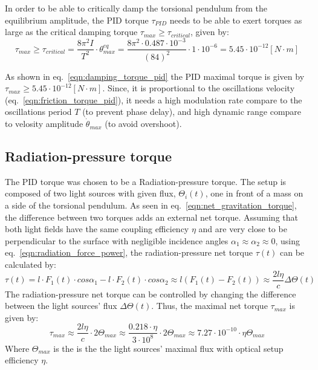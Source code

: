 \documentclass[\main/master.tex]{subfiles}
\begin{document}
In order to be able to critically damp the torsional pendulum from the equilibrium amplitude, the PID torque $\tau_{PID}$ needs to be able to exert torques as large as the critical damping torque $\tau_{max} \geq  \tau_{critical}$, given by:
\begin{equation}
\tau_{max} \geq  \tau_{critical} = \frac{ 8 \pi^2 I }{T^2}\cdot\theta_{max}^{eq} = \frac{ 8 \pi^2 \cdot 0.487\cdot10^{-3} }{(84)^2}\cdot 1\cdot10^{-6} = 5.45\cdot10^{-12}[N\cdot m]
\label{eqn:damping_torque_pid}
\end{equation}
\par\noindent
As shown in  eq.~\ref{eqn:damping_torque_pid} the PID maximal torque is given by $\tau_{max} \geq 5.45\cdot10^{-12}[N\cdot m]$. Since, it is proportional to the oscillations velocity (eq.~\ref{eqn:friction_torque_pid}), it needs a high modulation rate compare to the oscillations period $T$ (to prevent phase delay), and high dynamic range compare to velosity amplitude $\dot{\theta}_{max}$ (to avoid overshoot). 
\subsection{Radiation-pressure torque}
The PID torque was chosen to be a Radiation-pressure torque. The setup is composed of two light sources with given flux, $\Theta_i(t)$, one in front of a mass on a side of the torsional pendulum. As seen in eq.~\ref{eqn:net_gravitation_torque}, the difference between two torques adds an external net torque. Assuming that both light fields have the same coupling efficiency $\eta$ and are very close to be perpendicular to the surface with negligible incidence angles $\alpha_1\approx\alpha_2\approx 0$, using eq.~\ref{eqn:radiation_force_power}, the radiation-pressure net torque $\tau(t)$ can be calculated by:  
\begin{equation}
\tau(t) = l\cdot F_1(t) \cdot cos\alpha_1 - l\cdot F_2(t) \cdot cos\alpha_2\approx l(F_1(t) - F_2(t)) \approx \frac{2l\eta}{{c}} \Delta \Theta(t) \label{eqn:radiation torque}
\end{equation}
The radiation-pressure net torque can be controlled by changing the difference between the light sources' flux $\Delta \Theta(t)$. Thus, the maximal net torque $\tau_{max}$ is given by: 
\begin{equation}
\tau_{max}  \approx \frac{2l\eta}{{c}} \cdot 2 \Theta_{max} \approx \frac{0.218\cdot \eta}{{3\cdot10^{8}}} \cdot 2 \Theta_{max} \approx 7.27\cdot10^{-10} \cdot \eta\Theta_{max}   \label{eqn:max radiation torque}
\end{equation}
Where $\Theta_{max}$ is the is the the light sources' maximal flux with optical setup efficiency $\eta$. 
\end{document}
